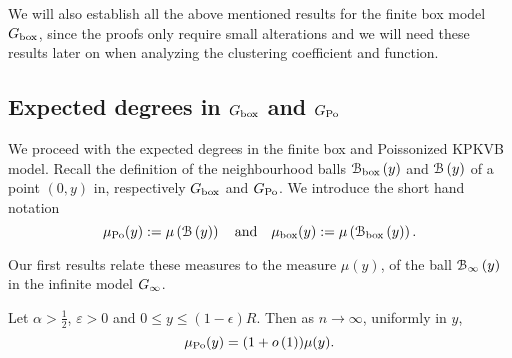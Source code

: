 We will also establish all the above mentioned results for the finite box model $G_{\mathrm{box}}$, since the proofs only require small 
alterations and we will need these results later on when analyzing the clustering coefficient and function.


\subsection{Expected degrees in \texorpdfstring{$G_{\mathrm{box}}$}{G box} and \texorpdfstring{$G_{{\mathrm{Po}}}$}{G Po}}\label{ssec:expected_degrees_GPo}

We proceed with the expected degrees in the finite box and Poissonized KPKVB model. Recall the definition of the neighbourhood balls ${\mathcal B}_{\text{box}}\left(y\right)$ and ${\mathcal B}\left(y\right)$ of a point $(0,y)$ in, respectively $G_{\mathrm{box}}$ and $G_{{\mathrm{Po}}}$. We introduce the short hand notation
\[
	\mu_{{\mathrm{Po}}}(y) := \mu\left({\mathcal B}\left(y\right)\right) \quad \text{and} \quad \mu_{\mathrm{box}}(y) := \mu\left({\mathcal B}_{\text{box}}\left(y\right)\right).
\]

Our first results relate these measures to the measure $\mu(y)$, of the ball ${\mathcal B}_{\infty}\left(y\right)$ in the infinite model $G_{\infty}$.

\begin{lemma}\label{lem:average_degree_P_n}
Let $\alpha > \frac{1}{2}$, $\varepsilon >0$ and $0 \leq y \leq (1-\epsilon)R$. Then as $n \to \infty$, uniformly in $y$,
\[
	\mu_{{\mathrm{Po}}}(y) = (1+o\left(1\right)) \mu(y).
\]
\end{lemma}

